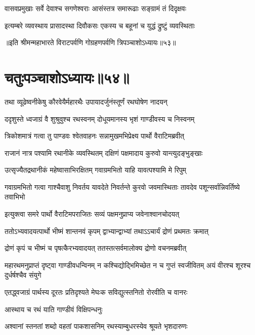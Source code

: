 \twolineshloka
{वासवप्रमुखाः सर्वे देवाश्च सगणेश्वराः}
{आसंस्तत्र समारूढाः सङ्ग्रामं तं दिदृक्षवः}


\twolineshloka
{इत्यम्बरे व्यवस्थाय प्रासादस्था दिवौकसः}
{एकस्य च बहूनां च युद्धं द्रुष्टुं व्यवस्थिताः}

॥इति श्रीमन्महाभारते विराटपर्वणि गोग्रहणपर्वणि त्रिपञ्चाशोऽध्यायः॥५३॥

\chapter{चतुःपञ्चाशोऽध्यायः॥५४॥}

\twolineshloka
{तथा व्यूढेष्वनीकेषु कौरवेयैर्महारथैः}
{उपायादर्जुनंस्तूर्णं रथघोषेण नादयन्}


\twolineshloka
{ददृशुस्ते ध्वजाग्रं वै शुश्रुवुश्च रथस्वनम्}
{दोधूयमानस्य भृशं गाण्डीवस्य च निस्वनम्}


\twolineshloka
{त्रिकोशमात्रं गत्वा तु पाण्डवः श्वेतवाहनः}
{सन्नामुखमभिप्रेक्ष्य पार्थो वैराटिमब्रवीत्}


\twolineshloka
{राजानं नात्र पश्यामि रथानीके व्यवस्थितम्}
{दक्षिणं पक्षमादाय कुरुवो यान्त्युदङ्भुङ्खाः}


\twolineshloka
{उत्सृज्यैतद्रथानीकं महेष्वासाभिरक्षितम्}
{गवाग्रमभितो याहि यावत्पश्यामि मे रिपुम्}


\threelineshloka
{गवाग्रमभितो गत्वा गाश्चैवाशु निवर्तय}
{यावदेते निवर्तन्ते कुरवो जवमास्थिताः}
{तावदेव पशून्सर्वान्निवर्तिष्ये तवाभिभो}



\twolineshloka
{इत्युक्त्वा समरे पार्थो वैराटिमपराजितः}
{सव्यं पक्षमनुप्राप्य जवेनाश्वानचोदयत्}


\twolineshloka
{ततोऽभ्यवादयत्पार्थो भीष्मं शान्तनवं कृपम्}
{द्वाभ्यान्द्वाभ्यां तथाऽऽचार्यं द्रोणं प्रथमतः क्रमात्}


\twolineshloka
{द्रोणं कृपं च भीष्मं च पृषत्कैरभ्यवादयत्}
{ततस्तत्सर्वमालोक्य द्रोणो वचनमब्रवीत्}


\threelineshloka
{महारथमनुप्राप्तं दृष्ट्वा गाण्डीवधन्विनम्}
{न कश्चिद्योद्भिमिच्छेत न च गुप्तं स्वजीवितम्}
{अयं वीरश्च शूरश्च दुर्धर्षश्चैव संयुगे}


\twolineshloka
{एतद्ध्वजाग्रं पार्थस्य दूरतः प्रतिदृश्यते}
{मेघःक सविद्युत्स्तनितो रोरवीति च वानरः}


\onelineshloka
{आस्थाय च रथं याति गाण्डीवं विक्षिपन्धनुः}


\twolineshloka
{अश्वानां स्तनतां शब्दो वहतां पाकशासनिम्}
{रथस्याम्बुधरस्येव श्रूयते भृशदारुणः}


